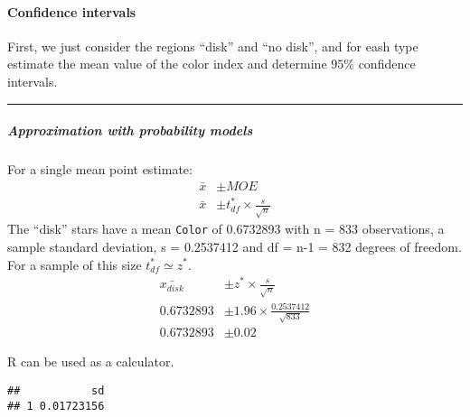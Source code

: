 \documentclass[]{article}
\newenvironment{Shaded}{\begin{snugshade}}{\end{snugshade}}
\newcommand{\FloatTok}[1]{\textcolor[rgb]{0.00,0.00,0.81}{#1}}
\newcommand{\KeywordTok}[1]{\textcolor[rgb]{0.13,0.29,0.53}{\textbf{#1}}}
\newcommand{\NormalTok}[1]{#1}
\newcommand{\OperatorTok}[1]{\textcolor[rgb]{0.81,0.36,0.00}{\textbf{#1}}}
\newcommand{\StringTok}[1]{\textcolor[rgb]{0.31,0.60,0.02}{#1}}
\let\oldparagraph\paragraph
\renewcommand{\paragraph}[1]{\oldparagraph{#1}\mbox{}}
\let\oldsubparagraph\subparagraph
\renewcommand{\subparagraph}[1]{\oldsubparagraph{#1}\mbox{}}
\begin{document}
\hypertarget{confidence-intervals-2}{%
\paragraph{Confidence intervals}\label{confidence-intervals-2}}

First, we just consider the regions ``disk'' and ``no disk'', and for
eash type estimate the mean value of the color index and determine
\(95\%\) confidence intervals.

\begin{center}\rule{0.5\linewidth}{\linethickness}\end{center}

\hypertarget{approximation-with-probability-models-1}{%
\subparagraph{Approximation with probability
models}\label{approximation-with-probability-models-1}}

For a single mean point estimate: \[
\begin{aligned}
\bar{x} & \pm MOE \\
\bar{x} & \pm t_{df}^{*} \times \frac{s}{\sqrt{n}}
\end{aligned}
\] The ``disk'' stars have a mean \texttt{Color} of 0.6732893 with n =
833 observations, a sample standard deviation, s = 0.2537412 and df =
n-1 = 832 degrees of freedom. For a sample of this size
\(t_{df}^{*} \simeq z^{*}\). \[
\begin{aligned}
\bar{x_{disk}} & \pm z^{*} \times \frac{s}{\sqrt{n}} \\
0.6732893 & \pm 1.96 \times \frac{0.2537412}{\sqrt{833}} \\
0.6732893 & \pm 0.02 
\end{aligned}
\]

R can be used as a calculator.

\begin{Shaded}
\end{Shaded}

\begin{verbatim}
##           sd
## 1 0.01723156
\end{verbatim}
\end{document}
